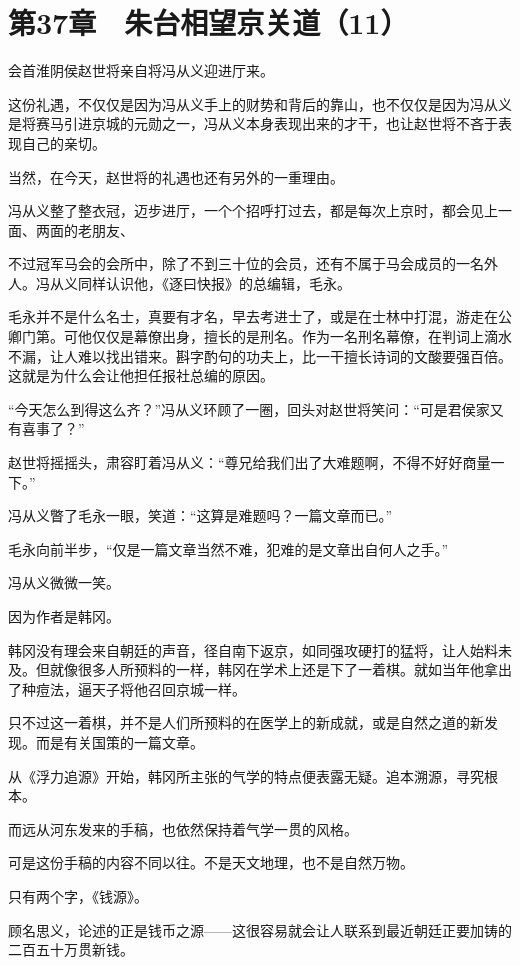 \section{第37章　朱台相望京关道（11）}

会首淮阴侯赵世将亲自将冯从义迎进厅来。

这份礼遇，不仅仅是因为冯从义手上的财势和背后的靠山，也不仅仅是因为冯从义是将赛马引进京城的元勋之一，冯从义本身表现出来的才干，也让赵世将不吝于表现自己的亲切。

当然，在今天，赵世将的礼遇也还有另外的一重理由。

冯从义整了整衣冠，迈步进厅，一个个招呼打过去，都是每次上京时，都会见上一面、两面的老朋友、

不过冠军马会的会所中，除了不到三十位的会员，还有不属于马会成员的一名外人。冯从义同样认识他，《逐曰快报》的总编辑，毛永。

毛永并不是什么名士，真要有才名，早去考进士了，或是在士林中打混，游走在公卿门第。可他仅仅是幕僚出身，擅长的是刑名。作为一名刑名幕僚，在判词上滴水不漏，让人难以找出错来。斟字酌句的功夫上，比一干擅长诗词的文酸要强百倍。这就是为什么会让他担任报社总编的原因。

“今天怎么到得这么齐？”冯从义环顾了一圈，回头对赵世将笑问：“可是君侯家又有喜事了？”

赵世将摇摇头，肃容盯着冯从义：“尊兄给我们出了大难题啊，不得不好好商量一下。”

冯从义瞥了毛永一眼，笑道：“这算是难题吗？一篇文章而已。”

毛永向前半步，“仅是一篇文章当然不难，犯难的是文章出自何人之手。”

冯从义微微一笑。

因为作者是韩冈。

韩冈没有理会来自朝廷的声音，径自南下返京，如同强攻硬打的猛将，让人始料未及。但就像很多人所预料的一样，韩冈在学术上还是下了一着棋。就如当年他拿出了种痘法，逼天子将他召回京城一样。

只不过这一着棋，并不是人们所预料的在医学上的新成就，或是自然之道的新发现。而是有关国策的一篇文章。

从《浮力追源》开始，韩冈所主张的气学的特点便表露无疑。追本溯源，寻究根本。

而远从河东发来的手稿，也依然保持着气学一贯的风格。

可是这份手稿的内容不同以往。不是天文地理，也不是自然万物。

只有两个字，《钱源》。

顾名思义，论述的正是钱币之源——这很容易就会让人联系到最近朝廷正要加铸的二百五十万贯新钱。


